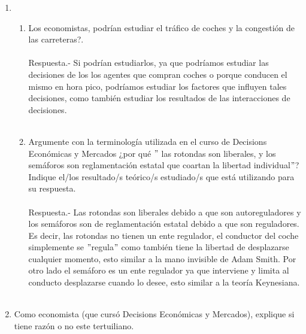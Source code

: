 \begin{enumerate}
\begin{enumerate}[\bfseries a)]
    \end{enumerate}

\item 
    \begin{enumerate}[\bfseries a)]

	\item Los economistas, podrían estudiar el tráfico de coches y la congestión de las carreteras?.\\\\
	    Respuesta.-\; Si podrían estudiarlos, ya que podríamos estudiar las decisiones de los los agentes que compran coches o porque conducen el mismo en hora pico, podríamos estudiar los factores que influyen tales decisiones, como también estudiar los resultados de las interacciones de decisiones.\\\\

	\item Argumente con la terminología utilizada en el curso de Decisions Económicas y Mercados ¿por qué $"$ las rotondas son liberales, y los semáforos son reglamentación estatal que coartan la libertad individual$"$? Indique el/los resultado/s teórico/s estudiado/s que está utilizando para su respuesta.\\\\
	    Respuesta.-\; Las rotondas son liberales debido a que son autoreguladores y los semáforos son de reglamentación estatal debido a que son reguladores. Es decir, las rotondas no tienen un ente regulador, el conductor del coche simplemente se $"$regula$"$ como también tiene la libertad de desplazarse cualquier momento, esto similar a la mano invisible de Adam Smith. Por otro lado el semáforo es un ente regulador ya que interviene y limita al conducto desplazarse cuando lo desee, esto similar a la teoría Keynesiana.\\\\

    \end{enumerate}

\item Como economista (que cursó Decisions Económicas y Mercados), explique si tiene razón o no este tertuiliano.\\

    \begin{enumerate}[\bfseries i)] 	


\end{enumerate}
\end{enumerate}
